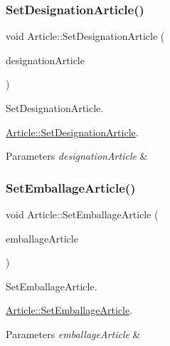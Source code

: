 \subsubsection{\texorpdfstring{Set\+Designation\+Article()}{SetDesignationArticle()}}
{\footnotesize\ttfamily void Article\+::\+Set\+Designation\+Article (\begin{DoxyParamCaption}\item[{Q\+String}]{designation\+Article }\end{DoxyParamCaption})}



Set\+Designation\+Article. 

\mbox{\hyperlink{class_article_a6ee68c7584a20323039ab5065c34eb81}{Article\+::\+Set\+Designation\+Article}}.


\begin{DoxyParams}{Parameters}
{\em designation\+Article} & \\
\hline
\end{DoxyParams}
\mbox{\label{class_article_abfde880e0537319807827026d0d7897f}} 
\subsubsection{\texorpdfstring{Set\+Emballage\+Article()}{SetEmballageArticle()}}
{\footnotesize\ttfamily void Article\+::\+Set\+Emballage\+Article (\begin{DoxyParamCaption}\item[{Q\+String}]{emballage\+Article }\end{DoxyParamCaption})}



Set\+Emballage\+Article. 

\mbox{\hyperlink{class_article_abfde880e0537319807827026d0d7897f}{Article\+::\+Set\+Emballage\+Article}}.


\begin{DoxyParams}{Parameters}
{\em emballage\+Article} & \\
\hline
\end{DoxyParams}
\mbox{\label{class_article_ae543837747d1022bd91afb5ca7e7cc32}} 
